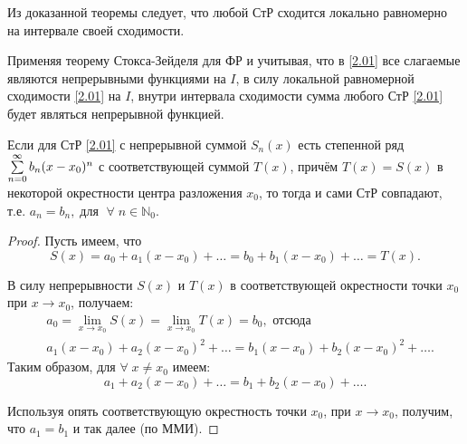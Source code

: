 \begin{notes}
	\item Из доказанной теоремы следует, что любой СтР сходится локально равномерно на интервале своей сходимости.
	
	\item Применяя теорему Стокса-Зейделя для ФР и учитывая, что в \eqref{2.01} все слагаемые являются непрерывными функциями на $ I $,
	в силу локальной равномерной сходимости \eqref{2.01} на $ I $, внутри интервала сходимости сумма любого СтР \eqref{2.01}  будет являться непрерывной функцией.
\end{notes}
\begin{consequence}
	Если для СтР \eqref{2.01} с непрерывной суммой $ S_n(x) $ есть степенной ряд
	$ \sum\limits_{n=0}^{\infty} b_n (x-x_0)^n $ с соответствующей суммой $ T(x) $, причём $ T(x) = S(x) $ в некоторой окрестности центра разложения \nolinebreak$ x_0 $, то тогда и сами СтР совпадают,
	т.е. $ a_n = b_n, \; \text{для } \; \forall \; n \in \mathbb{N}_0 $.
\end{consequence}

\begin{proof} Пусть имеем, что
	\begin{equation*}
	S(x) = a_0 + a_1 (x-x_0) + \ldots = b_0 + b_1 (x-x_0) + \ldots = T(x).
	\end{equation*}
	
	В силу непрерывности $ S(x) $ и $ T(x) $ в соответствующей окрестности точки $ x_0 $ при
	$ x \to x_0 $, получаем:
	\begin{equation*}
	\begin{split}
	& a_0 = \lim\limits_{x\to x_0} S(x) = \lim\limits_{x\to x_0} T(x) = b_0, \text{ отсюда }\\
	& a_1 (x-x_0) + a_2(x-x_0)^2 + \ldots = b_1 (x-x_0) + b_2(x-x_0)^2 + \ldots.
	\end{split}
	\end{equation*}
	Таким образом, для $ \forall \; x \neq x_0 $ имеем:
	\begin{equation*}
	a_1 + a_2(x-x_0)  + \ldots =  b_1 + b_2(x-x_0) + \ldots.
	\end{equation*}
	
	Используя опять соответствующую окрестность точки $ x_0 $, при $ x \to x_0 $, получим, что
	$ a_1 = b_1 $ и так далее (по ММИ).
\end{proof}